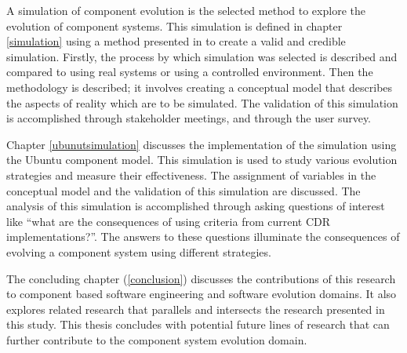 A simulation of component evolution is the selected method to explore the evolution of component systems.
This simulation is defined in chapter \ref{simulation} using a method presented in \cite{Law2005} to create a valid and credible simulation.
Firstly, the process by which simulation was selected is described and compared to using real systems or using a controlled environment.
Then the methodology is described; it involves creating a conceptual model that describes the aspects of reality which are to be simulated.
The validation of this simulation is accomplished through stakeholder meetings, and through the user survey.

Chapter \ref{ubunutsimulation} discusses the implementation of the simulation using the Ubuntu component model. 
This simulation is used to study various evolution strategies and measure their effectiveness.
The assignment of variables in the conceptual model and the validation of this simulation are discussed.
The analysis of this simulation is accomplished through asking questions of interest like ``what are the consequences of using criteria from current CDR implementations?''.
The answers to these questions illuminate the consequences of evolving a component system using different strategies.

The concluding chapter (\ref{conclusion}) discusses the contributions of this research to component based software engineering and software evolution domains.
It also explores related research that parallels and intersects the research presented in this study.
This thesis concludes with potential future lines of research that can further contribute to the component system evolution domain. 